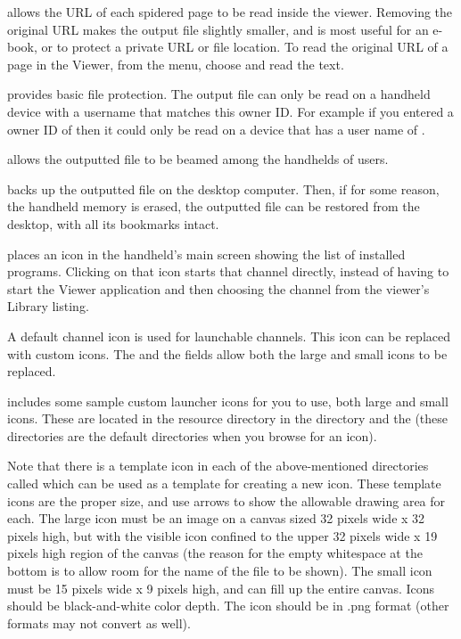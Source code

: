 allows the URL of each spidered page to be read inside the viewer. Removing the
original URL makes the output file slightly smaller, and is most useful for an
e-book, or to protect a private URL or file location. To read the original URL
of a page in the Viewer, from the menu, choose
 and read the  text.

 provides basic file protection. The output file can only be read
on a handheld device with a username that matches this owner ID. For example
if you entered a owner ID of  then it could only be read on a
device that has a user name of .

 allows
the outputted file to be beamed among the handhelds of \brandingapplicationsuitename users.

 backs up the outputted file on the desktop
computer. Then, if for some reason, the handheld memory is erased, the
outputted file can be restored from the desktop, with all its bookmarks intact.

 places an icon in the handheld's main screen showing
the list of installed programs. Clicking on that icon starts that channel
directly, instead of having to start the \brandingapplicationsuitename Viewer application and then
choosing the channel from the viewer's Library listing.

A default \brandingapplicationsuitename channel icon is used for launchable channels. This icon can
be replaced with custom icons. The  and the  fields allow both the large and small icons to be replaced. 

\brandingapplicationdesktopname includes some sample custom launcher icons for 
you to use, both large and small icons. These are located in the 
\brandingapplicationdesktopname resource directory in the  directory
and the  (these directories are the default directories when
you browse for an icon). 

Note that there is a template icon in each of the above-mentioned directories called 
 which can be used as a template for creating a new icon. These 
template icons are the proper size, and use arrows to show the allowable drawing 
area for each. The large icon must be an image on a canvas sized 32 pixels wide x 32 pixels
high, but with the visible icon confined to the upper 32 pixels wide x 19
pixels high region of the canvas (the reason for the empty whitespace at the bottom is
to allow room for the name of the file to be shown). 
The small icon must be 15 pixels wide x 9 pixels high, and can fill up the entire canvas.
Icons should be black-and-white color depth. The icon should be in .png format 
(other formats may not convert as well).

